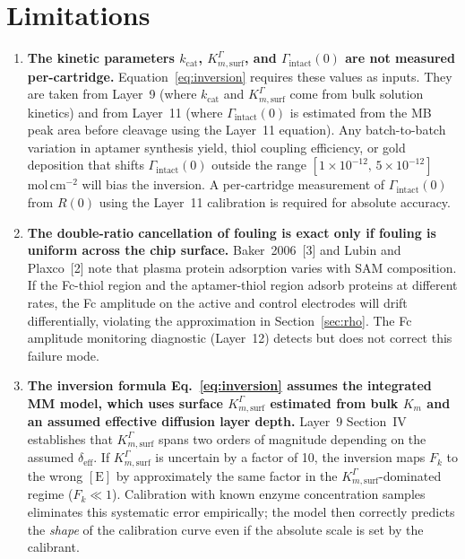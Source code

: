 \documentclass[10pt,a4paper]{article}
\numberwithin{equation}{section}
\newcommand{\cit}[1]{[#1]}
\newcommand{\Gtot}{\Gamma_{\text{intact}}}
\newcommand{\kcat}{k_{\text{cat}}}
\newcommand{\Km}{K_{m,\text{surf}}^{\Gamma}}
\newcommand{\Fk}{F_k}
\begin{document}
\section{Limitations}
\label{sec:limits}

\begin{enumerate}[leftmargin=*]

\item \textbf{The kinetic parameters $\kcat$, $\Km$, and $\Gtot(0)$ are
  not measured per-cartridge.} Equation~\eqref{eq:inversion} requires
  these values as inputs. They are taken from Layer~9 (where $\kcat$ and
  $\Km$ come from bulk solution kinetics) and from Layer~11 (where
  $\Gtot(0)$ is estimated from the MB peak area before cleavage using the
  Layer~11 equation). Any batch-to-batch variation in aptamer synthesis
  yield, thiol coupling efficiency, or gold deposition that shifts
  $\Gtot(0)$ outside the range $[1 \times 10^{-12},\,5 \times 10^{-12}]$
  mol\,cm$^{-2}$ will bias the inversion. A per-cartridge measurement of
  $\Gtot(0)$ from $R(0)$ using the Layer~11 calibration is required for
  absolute accuracy.

\item \textbf{The double-ratio cancellation of fouling is exact only if
  fouling is uniform across the chip surface.} Baker~2006~\cit{3} and
  Lubin and Plaxco~\cit{2} note that plasma protein adsorption varies
  with SAM composition. If the Fc-thiol region and the aptamer-thiol
  region adsorb proteins at different rates, the Fc amplitude on the active
  and control electrodes will drift differentially, violating the
  approximation in Section~\ref{sec:rho}. The Fc amplitude monitoring
  diagnostic (Layer~12) detects but does not correct this failure mode.

\item \textbf{The inversion formula Eq.~\eqref{eq:inversion} assumes the
  integrated MM model, which uses surface $\Km$ estimated from bulk
  $K_m$ and an assumed effective diffusion layer depth.} Layer~9
  Section~IV establishes that $\Km$ spans two orders of magnitude depending
  on the assumed $\delta_\text{eff}$. If $\Km$ is uncertain by a factor of
  10, the inversion maps $\Fk$ to the wrong $[\text{E}]$ by approximately
  the same factor in the $\Km$-dominated regime ($\Fk \ll 1$). Calibration
  with known enzyme concentration samples eliminates this systematic error
  empirically; the model then correctly predicts the \emph{shape} of the
  calibration curve even if the absolute scale is set by the calibrant.


\end{enumerate}
\end{document}
